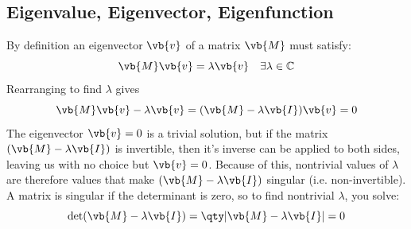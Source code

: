\subsection{Eigenvalue, Eigenvector, Eigenfunction}
By definition an eigenvector $\vb{v}$ of a matrix $\vb{M}$ must satisfy: 
    \[\vb{M}\vb{v}=\lambda\vb{v}\quad\exists\lambda\in\mathbb{C}\]
    Rearranging to find $\lambda$ gives
    \begin{equation*}
        \vb{M}\vb{v}-\lambda\vb{v}=(\vb{M}-\lambda\vb{I})\vb{v}=0
    \end{equation*}
    The eigenvector $\vb{v}=0$ is a trivial solution, but if the matrix $(\vb{M}-\lambda\vb{I})$ is invertible, then it's inverse can be applied to both sides, leaving us with no choice but $\vb{v}=0$. Because of this, nontrivial values of $\lambda$ are therefore values that make $(\vb{M}-\lambda\vb{I})$ singular (i.e. non-invertible). 
    A matrix is singular if the determinant is zero, so to find nontrivial $\lambda$, you solve: 
    \begin{equation*}
        \det(\vb{M}-\lambda\vb{I})=\qty|\vb{M}-\lambda\vb{I}|=0
    \end{equation*}
%